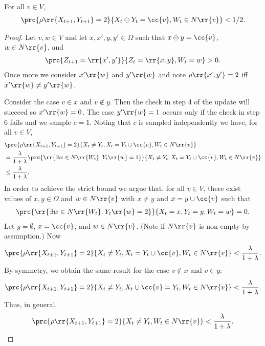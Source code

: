 \documentclass{article}
\begin{document}
\begin{claim*}[3c]
  For all $v\in V$,
  \begin{align*}
    \prc{\rho\rr{X_{t+1},Y_{t+1}}=2}{X_t\ominus Y_t=\cc{v},W_t\in N\rr{v}}<1/2.
  \end{align*}
  \begin{proof}
    Let $v,w\in V$ and let $x,x',y,y'\in\Omega$ such that $x\ominus y=\cc{v}$,
    $w\in N\rr{v}$, and
    \begin{align*}
      \prc{Z_{t+1}=\rr{x',y'}}{Z_t=\rr{x,y},W_t=w}>0.
    \end{align*}
    Once more we consider $x'\rr{w}$ and $y'\rr{w}$ and note $\rho\rr{x', y'}=2$
    iff $x'\rr{w}\neq y'\rr{w}$.

    Consider the case $v\in x$ and $v\not\in y$. Then the check in step 4 of the update
    will succeed so $x'\rr{w}=0$. The case $y'\rr{w}=1$ occurs only if the check in step
    6 fails and we sample $c=1$. Noting that $c$ is sampled independently we have, for all $v\in V$,
    \begin{align*}
      &\prc{\rho\rr{X_{t+1},Y_{t+1}}=2}{X_t\neq Y_t, X_t=Y_t\cup\cc{v},W_t\in N\rr{v}}\\
      &= \frac{\lambda}{1+\lambda}\prc{\rr{\exists w\in N\rr{W_t}. \: Y_t\rr{w}=1}}{X_t\neq Y_t, X_t=Y_t\cup\cc{v},W_t\in N\rr{v}} \\
      &\leq \frac{\lambda}{1+\lambda}.
    \end{align*}
    In order to achieve the strict bound we argue that, for all $v\in V$, there exist values
    of $x,y\in\Omega$ and $w\in N\rr{v}$ with $x\neq y$ and $x=y\cup\cc{v}$ such that
    \begin{align*}
      \prc{\rr{\exists w\in N\rr{W_t}. \: Y_t\rr{w}=2}}{X_t=x,Y_t=y,W_t=w} = 0.
    \end{align*}
    Let $y=\emptyset$, $x=\cc{v}$, and $w\in N\rr{v}$. (Note if $N\rr{v}$ is non-empty by assumption.)
    Now
    \begin{align*}
      \prc{\rho\rr{X_{t+1},Y_{t+1}}=2}{X_t\neq Y_t, X_t=Y_t\cup\cc{v},W_t\in N\rr{v}} < \frac{\lambda}{1+\lambda}.
    \end{align*}
    By symmetry, we obtain the same result for the case $v\not\in x$ and $v\in y$:
    \begin{align*}
      \prc{\rho\rr{X_{t+1},Y_{t+1}}=2}{X_t\neq Y_t, X_t\cup\cc{v}=Y_t,W_t\in N\rr{v}} < \frac{\lambda}{1+\lambda}.
    \end{align*}
    Thus, in general,
    \begin{align*}
      \prc{\rho\rr{X_{t+1},Y_{t+1}}=2}{X_t\neq Y_t,W_t\in N\rr{v}} < \frac{\lambda}{1+\lambda}.
    \end{align*}
  \end{proof}
\end{claim*}
\end{document}
